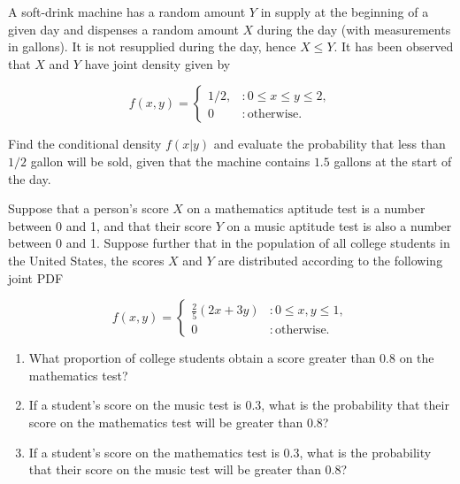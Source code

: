 \documentclass[12pt,reqno]{amsart}
\begin{document}
\bigskip
\prob A soft-drink machine has a random amount $Y$ in supply at the beginning of a given day and dispenses a random amount $X$ during the day (with measurements in gallons). It is not resupplied during the day, hence $X\leq Y$. It has been observed that $X$ and $Y$ have joint density given by

	\[
	f(x,y) = \begin{cases}
	1/2, & : 0 \leq x \leq y \leq 2, \\
	0 & : \text{otherwise}.
	\end{cases}
	\]

Find the conditional density $f(x|y)$ and evaluate the probability that less than $1/2$ gallon will be sold, given that the machine contains $1.5$ gallons at the start of the day.\vfill














\newpage
\prob Suppose that a person’s score $X$ on a mathematics aptitude test is a number between 0 and 1, and that their score $Y$ on a music aptitude test is also a number between 0 and 1. Suppose further that in the population of all college students in the United States, the scores $X$ and $Y$ are distributed according to the following joint PDF

	\[
	f(x,y) = \begin{cases}
	\frac{2}{5} (2x+3y) & : 0\leq x,y \leq 1, \\
	0 & : \text{otherwise}.
	\end{cases}
	\]

\medskip
\begin{enumerate}
\item What proportion of college students obtain a score greater than 0.8 on the mathematics test?\vfill
\item If a student’s score on the music test is 0.3, what is the probability that their score on the mathematics test will be greater than 0.8?\vfill
\item If a student’s score on the mathematics test is 0.3, what is the probability that their score on the music test will be greater than 0.8?\vfill
\end{enumerate}
\end{document}
